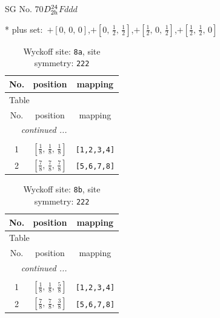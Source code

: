 \documentclass[fleqn,8pt]{jsarticle}
\begin{document}
\setcounter{MaxMatrixCols}{32}

\renewcommand{\tablename}{Table~}
\renewcommand{\figurename}{Figure~}
\begin{center}
\LARGE
SG No. 70\quad$D_{\rm 2h}^{24}$\quad$Fddd$\quad[ orthorhombic ]
\end{center}
* plus set:\,\,\,$+\left[ 0,\, 0,\, 0 \right]$,\quad $+\left[ 0,\, \frac{1}{2},\, \frac{1}{2} \right]$,\quad $+\left[ \frac{1}{2},\, 0,\, \frac{1}{2} \right]$,\quad $+\left[ \frac{1}{2},\, \frac{1}{2},\, 0 \right]$
\renewcommand{\arraystretch}{1.2}
\begin{longtable}{ccc}
\caption{Wyckoff site: {\tt 8a}, site symmetry: {\tt 222}}
 \\
 \hline \hline
No. & position & mapping \\ \hline \endfirsthead

\multicolumn{2}{l}{\tablename\ \thetable{}} \\
 \hline \hline
No. & position & mapping \\ \hline \endhead

 \hline \hline
\multicolumn{2}{r}{\footnotesize\it continued ...} \\ \endfoot

 \hline \hline
\multicolumn{2}{r}{} \\ \endlastfoot

1 & $\left[ \frac{1}{8},\, \frac{1}{8},\, \frac{1}{8} \right]$ & {\tt [1,2,3,4]} \\ \hline
2 & $\left[ \frac{7}{8},\, \frac{7}{8},\, \frac{7}{8} \right]$ & {\tt [5,6,7,8]} \\
\end{longtable}
\renewcommand{\arraystretch}{1.2}
\begin{longtable}{ccc}
\caption{Wyckoff site: {\tt 8b}, site symmetry: {\tt 222}}
 \\
 \hline \hline
No. & position & mapping \\ \hline \endfirsthead

\multicolumn{2}{l}{\tablename\ \thetable{}} \\
 \hline \hline
No. & position & mapping \\ \hline \endhead

 \hline \hline
\multicolumn{2}{r}{\footnotesize\it continued ...} \\ \endfoot

 \hline \hline
\multicolumn{2}{r}{} \\ \endlastfoot

1 & $\left[ \frac{1}{8},\, \frac{1}{8},\, \frac{5}{8} \right]$ & {\tt [1,2,3,4]} \\ \hline
2 & $\left[ \frac{7}{8},\, \frac{7}{8},\, \frac{3}{8} \right]$ & {\tt [5,6,7,8]} \\
\end{longtable}
\end{document}

